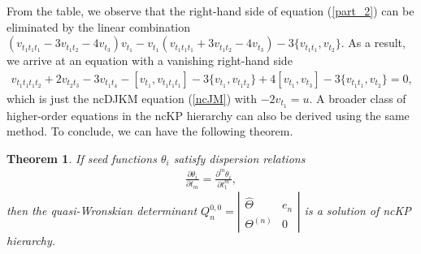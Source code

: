 \documentclass[11p,reqno]{amsart}
\numberwithin{equation}{section}
\newtheorem{theorem}{Theorem}[section]
\numberwithin{equation}{section}
\begin{document}
From the table, we observe that the right-hand side of equation (\ref{part_2}) can be eliminated by the linear combination $(v_{t_1t_1t_1} - 3v_{t_1t_2} - 4v_{t_3})v_{t_1} - v_{t_1}(v_{t_1t_1t_1} + 3v_{t_1t_2} - 4v_{t_3}) - 3\{v_{t_1t_1}, v_{t_2}\}$. As a result, we arrive at an equation with a vanishing right-hand side
\begin{align} 
        v_{t_1t_1t_1t_2} + 2 v_{t_2t_3} - 3v_{t_1t_4} - [v_{t_1}, v_{t_1t_1t_1}] - 3\{v_{t_1}, v_{t_1t_2}\} + 4[v_{t_1}, v_{t_3}] - 3\{v_{t_1t_1}, v_{t_2}\} = 0, 
\end{align}
which is just the ncDJKM equation (\ref{ncJM}) with $-2v_{t_1} = u$. A broader class of higher-order equations in the ncKP hierarchy can also be derived using the same method. To conclude, we can have the following theorem.
\begin{theorem}\label{thm_ncKP}
If seed functions $\theta_i$ satisfy dispersion relations 
\begin{align}\label{dispersion}
\frac{\partial \theta_i}{\partial t_m}=\frac{\partial^m \theta_i}{\partial t_1^m}, 
\end{align}
then the quasi-Wronskian determinant $Q_n^{0,0}=\left|
\begin{array}{cc}
    \widehat{\Theta} & e_{n} \\
    \Theta^{(n)} & \boxed{0}
\end{array}
\right|$ is a solution of ncKP hierarchy. 
\end{theorem}
\end{document}
